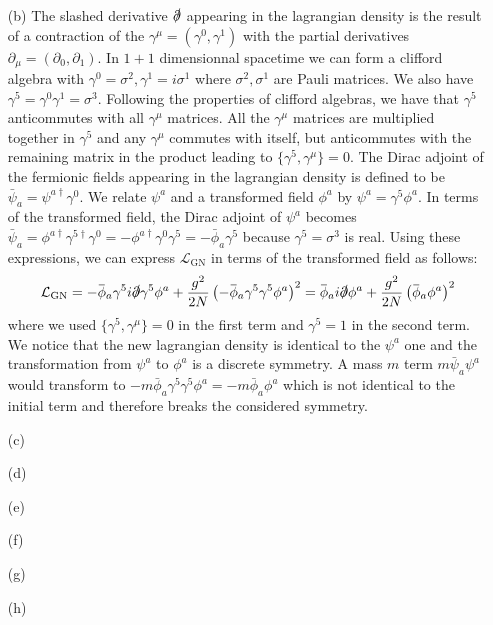 \documentclass[10pt, a4paper]{article}
\begin{document}
\begin{enumerate}
  \item[(b)] The slashed derivative $\slashed{\partial}$ appearing in the lagrangian density is the result of a contraction of the $\gamma^\mu = (\gamma^0, \gamma^1)$ with the partial derivatives $\partial_\mu = (\partial_0, \partial_1)$. In $1+1$ dimensionnal spacetime we can form a clifford algebra with $\gamma^0 = \sigma^2, \gamma^1 = i \sigma^1$ where $\sigma^2, \sigma^1$ are Pauli matrices. We also have $\gamma^5 = \gamma^0 \gamma^1 = \sigma^3$. Following the properties of clifford algebras, we have that $\gamma^5$ anticommutes with all $\gamma^\mu$ matrices. All the $\gamma^\mu$ matrices are multiplied together in $\gamma^5$ and any $\gamma^\mu$ commutes with itself, but anticommutes with the remaining matrix in the product leading to $\{\gamma^5, \gamma^\mu\} = 0$. The Dirac adjoint of the fermionic fields appearing in the lagrangian density is defined to be $\bar{\psi}_a = \psi^{a\dagger} \gamma^0$.  We relate $\psi^{a}$ and a transformed field $\phi^{a}$ by $\psi^{a} = \gamma^5 \phi^{a}$. In terms of the transformed field, the  Dirac adjoint of $\psi^{a}$ becomes $\bar{\psi}_a = \phi^{a\dagger}\gamma^{5\dagger} \gamma^0 = -\phi^{a\dagger} \gamma^0 \gamma^{5} = -\bar{\phi}_a \gamma^5$ because $\gamma^5 = \sigma^3$ is real. Using these expressions, we can express $\mathcal{L}_{\mathrm{GN}}$ in terms of the transformed field as follows: 
  \begin{align*}
    \mathcal{L}_{\mathrm{GN}}=-\bar{\phi}_a \gamma^5 i \slashed{\partial} \gamma^5 \phi^a+\frac{g^2}{2 N}\left(-\bar{\phi}_a \gamma^5 \gamma^5 \phi^a\right)^2 = \bar{\phi}_a i \slashed{\partial}  \phi^a+\frac{g^2}{2 N}\left(\bar{\phi}_a \phi^a\right)^2  
  \end{align*}
  where we used $\{\gamma^5, \gamma^\mu\} = 0$ in the first term and $\gamma^5 = 1$ in the second term. We notice that the new lagrangian density is identical to the $\psi^a$ one and the transformation from $\psi^a$ to $\phi^a$ is a discrete symmetry. A mass $m$ term $m \bar{\psi}_a \psi^a$ would transform to $-m \bar{\phi}_a \gamma^5 \gamma^5 \phi^a = -m \bar{\phi}_a \phi^a$ which is not identical to the initial term and therefore breaks the considered symmetry. 
  \item[(c)]
  \item[(d)]
  \item[(e)]
  \item[(f)] 
  \item[(g)]
  \item[(h)]
\end{enumerate}
\end{document}
